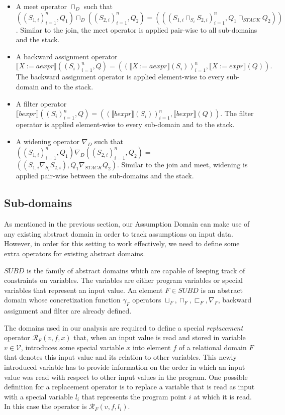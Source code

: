 \documentclass[10pt]{report}
\begin{document}
\begin{itemize}
	\item A meet operator $\sqcap_{D}$ such that $ ((S_{1,i})_{i=1}^{n}, Q_{1}) \sqcap_{D} ((S_{2,i})_{i=1}^{n}, Q_{2}) = (((S_{1,i} \sqcap_{S_{i}} S_{2,i})_{i=1}^{n}, Q_{1} \sqcap_{STACK} Q_{2}))$. Similar to the join, the meet operator is applied pair-wise to all sub-domains and the stack.
	\item A backward assignment operator $\llbracket X:=aexpr \rrbracket ((S_{i})_{i=1}^{n}, Q) =  ((\llbracket X:=aexpr \rrbracket(S_{i}))_{i=1}^{n}, \llbracket X:= expr \rrbracket(Q)).$ The backward assignment operator is applied element-wise to every sub-domain and to the stack. 
	\item A filter operator $ \llbracket bexpr \rrbracket ((S_{i})_{i=1}^{n}, Q) =  ((\llbracket bexpr \rrbracket(S_{i}))_{i=1}^{n}, \llbracket bexpr \rrbracket(Q)). $ The filter operator is applied element-wise to every sub-domain and to the stack.
	\item A widening operator $\nabla_{D}$ such that $ ((S_{1,i})_{i=1}^{n}, Q_{1}) \nabla_{D} ((S_{2,i})_{i=1}^{n}, Q_{2}) = $ $ ((S_{1, i} \nabla_{S_{i}} S_{2,i}), Q_{1} \nabla_{STACK} Q_{2}) .$ Similar to the join and meet, widening is applied pair-wise between the sub-domains and the stack. 
\end{itemize}

\subsection{Sub-domains} \label{sub-domains}

As mentioned in the previous section, our Assumption Domain can make use of any existing abstract domain in order to track assumptions on input data. However, in order for this setting to work effectively, we need to define some extra operators for existing abstract domains. 

$SUBD$ is the family of abstract domains which are capable of keeping track of constraints on variables. The variables are either program variables or special variables that represent an input value. An element $F \in SUBD$ is an abstract domain whose concretization function $\gamma_{F}$ operators $\sqcup_{F}, \sqcap_{F}, \sqsubset_{F}, \nabla_{F}$, backward assignment and filter are already defined.
 
The domains used in our analysis are required to define a special \textit{replacement} operator $ \mathcal{R}_{F}(v, f, x) $ that, when an input value is read and stored in variable $ v \in \mathcal{V} $, introduces some special variable $ x $ into element $ f $ of a relational domain $ F $ that denotes this input value and its relation to other variables. This newly introduced variable has to provide information on the order in which an input value was read with respect to other input values in the program. One possible definition for a replacement operator is to replace a variable that is read as input with a special variable $ l_{i} $ that represents the program point $ i $ at which it is read. In this case the operator is $ \mathcal{R}_{F}(v, f, l_{i}) $. 
\end{document}
